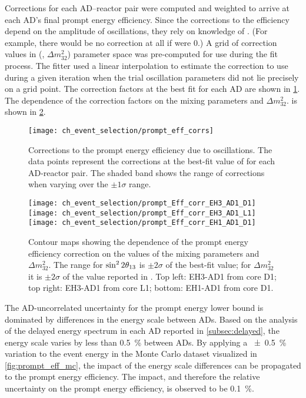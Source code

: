 Corrections for each AD--reactor pair were computed
and weighted to arrive at each AD's final prompt energy efficiency.
Since the corrections to the efficiency depend on
the amplitude of \nuebar{} oscillations, they rely on knowledge of \thetaot.
(For example, there would be no correction at all if \thetaot{} were $0$.)
A grid of correction values in (\thetaot{}, $\Delta m^2_{32}$) parameter space
was pre-computed for use during the fit process.
The fitter used a linear interpolation to estimate the correction to use
during a given iteration when the trial oscillation parameters
did not lie precisely on a grid point.
The correction factors at the best fit \thetaot{}
for each AD are shown in \cref{fig:prompt_eff_osc}.
The dependence of the correction factors on the mixing parameters \thetaot{} and $\Delta m^2_{32}$.
is shown in \cref{fig:prompt_eff_osc_contour}.

\begin{figure}
    \centering
    \texttt{[image: ch\_event\_selection/prompt\_eff\_corrs]}
    \caption{
        Corrections to the prompt energy efficiency due to \nuebar{} oscillations.
        The data points represent the corrections at the best-fit
        value of \thetaot{} for each AD-reactor pair.
        The shaded band shows the range of corrections when varying \thetaot{}
        over the $\pm1\sigma$ range.
    }
    \label{fig:prompt_eff_osc}
\end{figure}

\begin{figure}
    \centering
    \texttt{[image: ch\_event\_selection/prompt\_Eff\_corr\_EH3\_AD1\_D1]}
    \texttt{[image: ch\_event\_selection/prompt\_Eff\_corr\_EH3\_AD1\_L1]}
    \\
    \texttt{[image: ch\_event\_selection/prompt\_Eff\_corr\_EH1\_AD1\_D1]}
    \caption{
        Contour maps showing the dependence of the prompt energy efficiency correction
        on the values of the mixing parameters \thetaot{} and $\Delta m^2_{32}$.
        The range for $\sin^22\theta_{13}{}$ is $\pm2\sigma$ of the best-fit value;
        for $\Delta m^2_{32}$ it is $\pm2\sigma$ of the value reported in \cite{ngd2018}.
        Top left: EH3-AD1 from core D1;
        top right: EH3-AD1 from core L1;
        bottom: EH1-AD1 from core D1.
    }
    \label{fig:prompt_eff_osc_contour}
\end{figure}

The AD-uncorrelated uncertainty for the prompt energy lower bound
is dominated by differences in the energy scale between ADs.
Based on the analysis of the delayed energy spectrum in each AD
reported in \cref{subsec:delayed}, the energy scale
varies by less than \SI{0.5}{\percent} between ADs.
By applying a \SI{+-0.5}{\percent} variation to
the event energy in the Monte Carlo dataset visualized in \cref{fig:prompt_eff_mc},
the impact of the energy scale differences can be propagated
to the prompt energy efficiency.
The impact, and therefore the relative uncertainty on
the prompt energy efficiency, is observed to be \SI{0.1}{\percent}.



